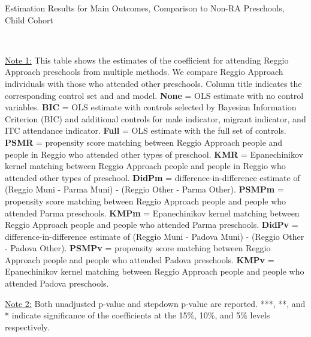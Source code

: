 \begin{table}[H] \caption{Estimation Results for Main Outcomes, Comparison to Non-RA Preschools, Child Cohort} \label{ols-M-child-reg-pres}
\scalebox{0.59}{}
\vspace{1ex} \\
\footnotesize\raggedright{\underline{Note 1:} This table shows the estimates of the coefficient for attending Reggio Approach preschools from multiple methods. We compare Reggio Approach individuals with those who attended other preschools. Column title indicates the corresponding control set and and model. \textbf{None} = OLS estimate with no control variables. \textbf{BIC} = OLS estimate with controls selected by Bayesian Information Criterion (BIC) and additional controls for male indicator, migrant indicator, and ITC attendance indicator. \textbf{Full} = OLS estimate with the full set of controls. \textbf{PSMR} =  propensity score matching between Reggio Approach people and people in Reggio who attended other types of preschool. \textbf{KMR} = Epanechinikov kernel matching between Reggio Approach people and people in Reggio who attended other types of preschool. \textbf{DidPm} = difference-in-difference estimate of (Reggio Muni - Parma Muni) - (Reggio Other - Parma Other). \textbf{PSMPm} = propensity score matching between Reggio Approach people and people who attended Parma preschools. \textbf{KMPm} = Epanechinikov kernel matching between Reggio Approach people and people who attended Parma preschools. \textbf{DidPv} = difference-in-difference estimate of (Reggio Muni - Padova Muni) - (Reggio Other - Padova Other). \textbf{PSMPv} = propensity score matching between Reggio Approach people and people who attended Padova preschools. \textbf{KMPv} = Epanechinikov kernel matching between Reggio Approach people and people who attended Padova preschools.}

\footnotesize\raggedright{\underline{Note 2:} Both unadjusted p-value and stepdown p-value are reported. ***, **, and * indicate significance of the coefficients at the 15\%, 10\%, and 5\% levels respectively.}

\end{table}


